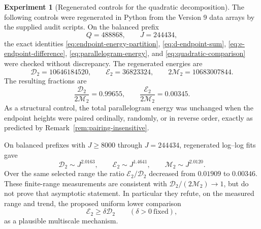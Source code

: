 \documentclass[11pt]{amsart}
\numberwithin{equation}{section}
\theoremstyle{plain}
\theoremstyle{definition}
\newtheorem{experiment}[theorem]{Experiment}
\theoremstyle{remark}
\begin{document}
\begin{experiment}[Regenerated controls for the quadratic decomposition]
\label{exp:v6-quadratic-controls}
The following controls were regenerated in Python from the Version 9 data
arrays by the supplied audit scripts.  On the
balanced prefix
\begin{equation}
\label{eq:v6-balanced-range}
Q=488868,
\qquad
J=244434,
\end{equation}
the exact identities
\eqref{eq:endpoint-energy-partition}, \eqref{eq:d-endpoint-sum},
\eqref{eq:e-endpoint-difference}, \eqref{eq:parallelogram-energy}, and
\eqref{eq:quadratic-comparison} were checked without discrepancy.  The regenerated
energies are
\begin{equation}
\label{eq:v6-energy-values}
\mathcal D_2=10646184520,
\qquad
\mathcal E_2=36823324,
\qquad
2\mathcal M_2=10683007844.
\end{equation}
The resulting fractions are
\begin{equation}
\label{eq:v6-energy-fractions}
\frac{\mathcal D_2}{2\mathcal M_2}=0.99655,
\qquad
\frac{\mathcal E_2}{2\mathcal M_2}=0.00345.
\end{equation}
As a structural control, the total parallelogram energy was unchanged when the
endpoint heights were paired ordinally, randomly, or in reverse order, exactly
as predicted by Remark~\ref{rem:pairing-insensitive}.

On balanced prefixes with $J\ge8000$ through $J=244434$, regenerated log--log
fits gave
\begin{equation}
\label{eq:v6-power-fits}
\mathcal D_2\sim J^{2.0163},
\qquad
\mathcal E_2\sim J^{1.4641},
\qquad
\mathcal M_2\sim J^{2.0120}.
\end{equation}
Over the same selected range the ratio $\mathcal E_2/\mathcal D_2$ decreased
from $0.01909$ to $0.00346$.
These finite-range measurements are consistent with
$\mathcal D_2/(2\mathcal M_2)\to1$, but do not prove that asymptotic statement.
In particular they refute, on the measured range and trend, the proposed
uniform lower comparison
\begin{equation}
\label{eq:false-contraction}
\mathcal E_2\ge\delta\mathcal D_2
\qquad(\delta>0\ \text{fixed}),
\end{equation}
as a plausible multiscale mechanism.
\end{experiment}
\end{document}
